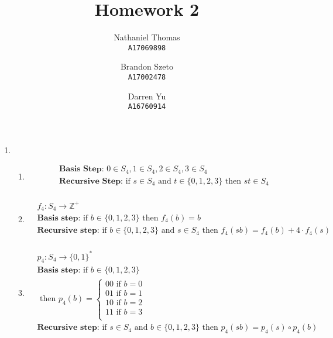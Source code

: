 \documentclass{article}
\title{Homework 2}
\author{
	Nathaniel Thomas\\
	\texttt{A17069898}
	\and
	Brandon Szeto\\
	\texttt{A17002478}
	\and
	Darren Yu\\
	\texttt{A16760914}
}
\begin{document}
\maketitle

\begin{enumerate}
	\item \begin{enumerate}
		      \item \begin{align*}
			             & \textbf{Basis Step: }
			            0 \in S_4, 1 \in S_4, 2 \in S_4, 3 \in S_4                                      \\
			             & \textbf{Recursive Step: }
			            \text{if } s \in S_4 \text{ and } t \in \{0, 1, 2, 3\} \text{ then } st \in S_4 \\
		            \end{align*}

		      \item \begin{align*}
			             & f_4: S_4 \to \mathbb{Z}^+                                                                                                       \\
			             & \textbf{Basis step: }       \text{if } b \in \{0,1,2,3\} \text{ then } f_4(b) = b                                               \\
			             & \textbf{Recursive step: }   \text{if } b \in \{0,1,2,3\} \text{ and } s \in S_4 \text{ then } f_4(sb) = f_4(b) + 4 \cdot f_4(s) \\
		            \end{align*}

		      \item \begin{align*}
			             & p_4: S_4 \to \{0, 1\}^*                                                                                                   \\
			             & \textbf{Basis step: } \text{if } b \in \{0,1,2,3\}                                                                        \\
			             & \text{ then }
			            p_4(b) =
			            \begin{cases}
				            00 \text{ if } b = 0 \\
				            01 \text{ if } b = 1 \\
				            10 \text{ if } b = 2 \\
				            11 \text{ if } b = 3 \\
			            \end{cases}                                                                                                         \\
			             & \textbf{Recursive step: } \text{if } s \in S_4 \text{ and } b \in \{0,1,2,3\} \text{ then } p_4(sb) = p_4(s) \circ p_4(b) \\
		            \end{align*}
	      \end{enumerate}


\end{enumerate}
\end{document}
